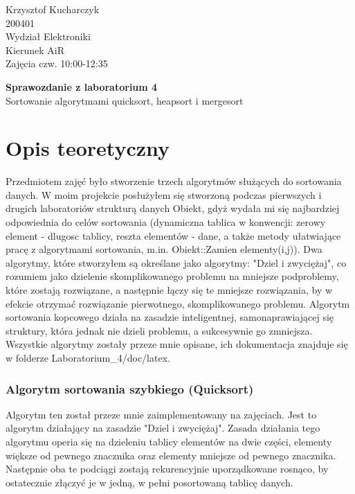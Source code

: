 \documentclass[a4paper,12pt]{report}
\begin{document}
{\raggedleft{}Krzysztof Kucharczyk}\\200401\\Wydział Elektroniki\\Kierunek AiR\\Zajęcia czw. 10:00-12:35\\

\begin{doublespace}
\begin{center} \textbf{{\large Sprawozdanie z laboratorium 4}}\\Sortowanie algorytmami quicksort, heapsort i mergesort	
\end{center}
\end{doublespace}
\section{Opis teoretyczny}

Przedmiotem zajęć było stworzenie trzech algorytmów służących do sortowania danych. W moim projekcie posłużyłem się stworzoną podczas pierwszych i drugich 
laboratoriów strukturą danych Obiekt, gdyż wydała mi się najbardziej odpowiednia do celów sortowania (dynamiczna tablica w konwencji: zerowy element - dlugosc 
tablicy, reszta elementów - dane, a także metody ułatwiające pracę z algorytmami sortowania, m.in. Obiekt::Zamien elementy(i,j)). Dwa algorytmy, które stworzyłem
są określane jako algorytmy: "Dziel i zwyciężaj", co rozumiem jako dzielenie skomplikowanego problemu na mniejsze podproblemy, które zostają rozwiązane, a następnie
łączy się te mniejsze rozwiązania, by w efekcie otrzymać rozwiązanie pierwotnego, skomplikowanego problemu. Algorytm sortowania kopcowego działa na zasadzie 
inteligentnej, samonaprawiającej się struktury, która jednak nie dzieli problemu, a sukcesywnie go zmniejsza. Wszystkie algorytmy zostały przeze mnie opisane, ich 
dokumentacja znajduje się w folderze Laboratorium_4/doc/latex.

\subsubsection{Algorytm sortowania szybkiego (Quicksort)}

Algorytm ten został przeze mnie zaimplementowany na zajęciach. Jest to algorytm działający na zasadzie "Dziel i zwyciężaj". Zasada działania tego algorytmu operia się
na dzieleniu tablicy elementów na dwie części, elementy większe od pewnego znacznika oraz elementy mniejsze od pewnego znacznika. Następnie oba te podciągi zostają
rekurencyjnie uporządkowane rosnąco, by ostatecznie złączyć je w jedną, w pełni posortowaną tablicę danych. 
\end{document}
